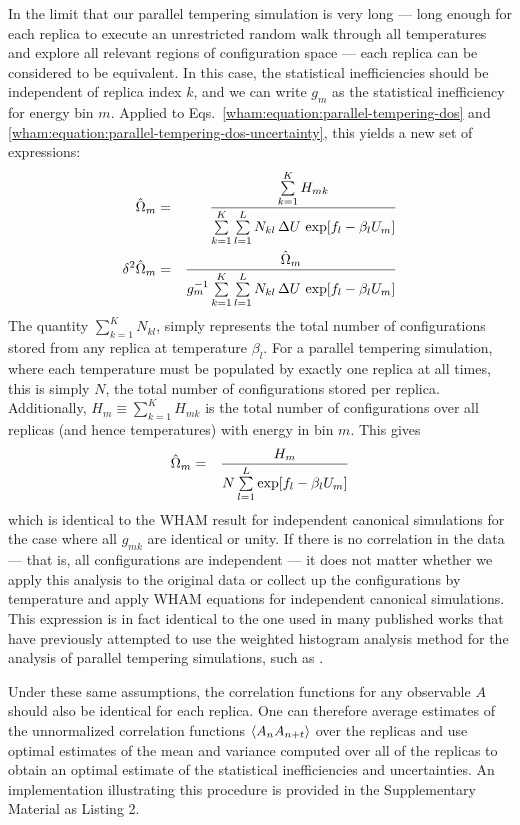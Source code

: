 In the limit that our parallel tempering simulation is very long --- long enough for each replica to execute an unrestricted random walk through all temperatures and explore all relevant regions of configuration space --- each replica can be considered to be equivalent. In this case, the statistical inefficiencies should be independent of replica index $k$, and we can write $g_m$ as the statistical inefficiency for energy bin $m$.  Applied to Eqs.\ \ref{wham:equation:parallel-tempering-dos} and \ref{wham:equation:parallel-tempering-dos-uncertainty}, this yields a new set of expressions:
\begin{eqnarray}
\hat{\Omega}_m &=& \frac{\sum\limits_{k=1}^K H_{mk}}{\sum\limits_{k=1}^{K} \sum\limits_{l=1}^{L} N_{kl} \, \Delta U \, \exp[f_{l} - \beta_{l} U_m]} \\
\delta^2 \hat{\Omega}_m &=& \frac{\hat{\Omega}_m}{g_m^{-1}  \sum\limits_{k = 1}^{K} \sum\limits_{l=1}^{L} N_{kl} \, \Delta U \, \exp[f_l - \beta_l U_m]}
\end{eqnarray}
The quantity $\sum_{k=1}^K N_{kl}$, simply represents the total number of configurations stored from any replica at temperature $\beta_l$.  For a parallel tempering simulation, where each temperature must be populated by exactly one replica at all times, this is simply $N$, the total number of configurations stored per replica.  Additionally, $H_m \equiv \sum_{k=1}^K H_{mk}$ is the total number of configurations over all replicas (and hence temperatures) with energy in bin $m$.  This gives
\begin{eqnarray}
\hat{\Omega}_m &=& \frac{H_m}{N \sum\limits_{l=1}^L \exp[f_l - \beta_l U_m]}
\end{eqnarray}
which is identical to the WHAM result for independent canonical simulations for the case where all $g_{mk}$ are identical or unity.  If there is no correlation in the data --- that is, all configurations are independent --- it does not matter whether we apply this analysis to the original data or collect up the configurations by temperature and apply WHAM equations for independent canonical simulations.  This expression is in fact identical to the one used in many published works that have previously attempted to use the weighted histogram analysis method for the analysis of parallel tempering simulations, such as \cite{sugita:1999a,okamoto:2004a}.

Under these same assumptions, the correlation functions for any observable $A$ should also be identical for each replica.  One can therefore average estimates of the unnormalized correlation functions $\langle A_n A_{n+t} \rangle$ over the replicas and use optimal estimates of the mean and variance computed over all of the replicas to obtain an optimal estimate of the statistical inefficiencies and uncertainties.  An implementation illustrating this procedure is provided in the Supplementary Material as Listing 2. 

